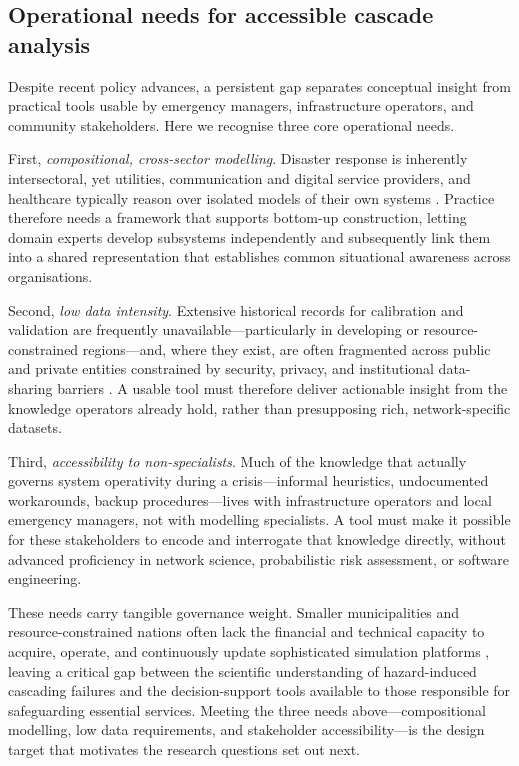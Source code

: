 \documentclass[review,12pt]{elsarticle}
\begin{document}
\subsection{Operational needs for accessible cascade analysis}
\label{subsec:operational_need}
Despite recent policy advances, a persistent gap separates conceptual insight from practical tools usable by emergency managers, infrastructure operators, and community stakeholders. Here we recognise three core operational needs.

First, \emph{compositional, cross-sector modelling}. Disaster response is inherently intersectoral, yet utilities, communication and digital service providers, and healthcare typically reason over isolated models of their own systems \cite{ouyang_review_2014,UNISDR2015Sendai}. Practice therefore needs a framework that supports bottom-up construction, letting domain experts develop subsystems independently and subsequently link them into a shared representation that establishes common situational awareness across organisations.

Second, \emph{low data intensity}. Extensive historical records for calibration and validation are frequently unavailable---particularly in developing or resource-constrained regions---and, where they exist, are often fragmented across public and private entities constrained by security, privacy, and institutional data-sharing barriers \cite{balakrishnan_infrarisk_2022,Barriers_data_sharing,data_sharing_fundamentals}. A usable tool must therefore deliver actionable insight from the knowledge operators already hold, rather than presupposing rich, network-specific datasets.

Third, \emph{accessibility to non-specialists}. Much of the knowledge that actually governs system operativity during a crisis---informal heuristics, undocumented workarounds, backup procedures---lives with infrastructure operators and local emergency managers, not with modelling specialists. A tool must make it possible for these stakeholders to encode and interrogate that knowledge directly, without advanced proficiency in network science, probabilistic risk assessment, or software engineering.

These needs carry tangible governance weight. Smaller municipalities and resource-constrained nations often lack the financial and technical capacity to acquire, operate, and continuously update sophisticated simulation platforms \cite{UNDRR2022GAR}, leaving a critical gap between the scientific understanding of hazard-induced cascading failures and the decision-support tools available to those responsible for safeguarding essential services. Meeting the three needs above---compositional modelling, low data requirements, and stakeholder accessibility---is the design target that motivates the research questions set out next.
\end{document}
